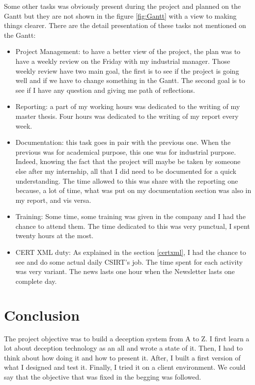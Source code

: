 \documentclass{tnreport}
\begin{document}
Some other tasks was obviously present during the project and planned on the Gantt but they are not shown in the figure \ref{fig:Gantt} with a view to making things clearer. There are the detail presentation of these tasks not mentioned on the Gantt: 
\begin{itemize}
    \item Project Management: to have a better view of the project, the plan was to have a weekly review on the Friday with my industrial manager. Those weekly review have two main goal, the first is to see if the project is going well and if we have to change something in the Gantt. The second goal is to see if I have any question and giving me path of reflections.
    \item Reporting: a part of my working hours was dedicated to the writing of my master thesis. Four hours was dedicated to the writing of my report every week.
    \item Documentation: this task goes in pair with the previous one. When the previous was for academical purpose, this one was for industrial purpose. Indeed, knowing the fact that the project will maybe be taken by someone else after my internship, all that I did need to be documented for a quick understanding. The time allowed to this was share with the reporting one because, a lot of time, what was put on my documentation section was also in my report, and vis versa.
    \item Training: Some time, some training was given in the company and I had the chance to attend them. The time dedicated to this was very punctual, I spent twenty hours at the most.
    \item CERT XML duty: As explained in the section \ref{certxml}, I had the chance to see and do some actual daily \gls{CSIRT}'s job. The time spent for each activity was very variant. The news lasts one hour when the Newsletter lasts one complete day.
\end{itemize}






\cleardoublepage


\chapter{Conclusion}
The project objective was to build a deception system from A to Z. I first learn a lot about deception technology as an all and wrote a state of it. Then, I had to think about how doing it and how to present it. After, I built a first version of what I designed and test it. Finally, I tried it on a client environment. We could say that the objective that was fixed in the begging was followed. 
\end{document}
